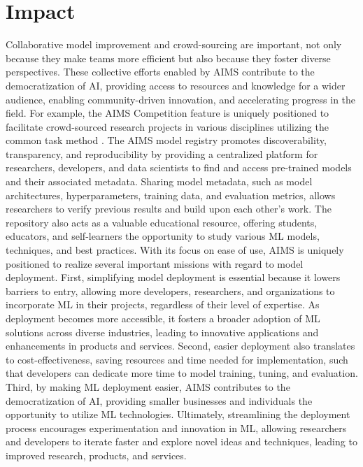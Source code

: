 \section{Impact}
Collaborative model improvement and crowd-sourcing are important, not only because they make teams more efficient but also because they foster diverse perspectives. These collective efforts enabled by AIMS contribute to the democratization of AI, providing access to resources and knowledge for a wider audience, enabling community-driven innovation, and accelerating progress in the field. For example, the AIMS Competition feature is uniquely positioned to facilitate crowd-sourced research projects in various disciplines utilizing the common task method \citep{salganik_measuring_2020}. 
The AIMS model registry promotes discoverability,  transparency, and reproducibility by providing a centralized platform for researchers, developers, and data scientists to find and access pre-trained models and their associated metadata. Sharing model metadata, such as model architectures, hyperparameters, training data, and evaluation metrics, allows researchers to verify previous results and build upon each other's work. The repository also acts as a valuable educational resource, offering students, educators, and self-learners the opportunity to study various ML models, techniques, and best practices.
With its focus on ease of use, AIMS is uniquely positioned to realize several important missions with regard to model deployment. First, simplifying model deployment is essential because it lowers barriers to entry, allowing more developers, researchers, and organizations to incorporate ML in their projects, regardless of their level of expertise. As deployment becomes more accessible, it fosters a broader adoption of ML solutions across diverse industries, leading to innovative applications and enhancements in products and services. Second, easier deployment also translates to cost-effectiveness, saving resources and time needed for implementation, such that developers can dedicate more time to model training, tuning, and evaluation. Third, by making ML deployment easier, AIMS contributes to the democratization of AI, providing smaller businesses and individuals the opportunity to utilize ML technologies. Ultimately, streamlining the deployment process encourages experimentation and innovation in ML, allowing researchers and developers to iterate faster and explore novel ideas and techniques, leading to improved research, products, and services. 

